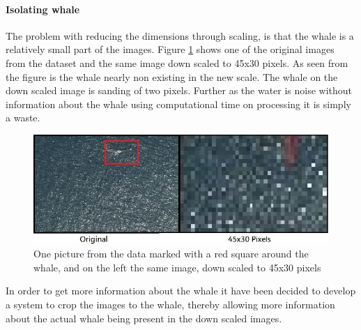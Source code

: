 \paragraph{Isolating whale}
The problem with reducing the dimensions through scaling, is that the whale is a relatively small part of the images. Figure \ref{fig:scale} shows one of the original images from the dataset and the same image down scaled to 45x30 pixels. As seen from the figure is the whale nearly non existing in the new scale. The whale on the down scaled image is sanding of two pixels.  
Further as the water is noise without information about the whale using computational time on processing it is simply a waste.
\begin{figure}
\centering
\includegraphics[scale=0.3]{Images/scale}
\caption{One picture from the data marked with a red square around the whale, and on the left the same image, down scaled to 45x30 pixels}
\label{fig:scale}
\end{figure}

In order to get more information about the whale it have been decided to develop a system to crop the images to the whale, thereby allowing more information about the actual whale being present in the down scaled images.

